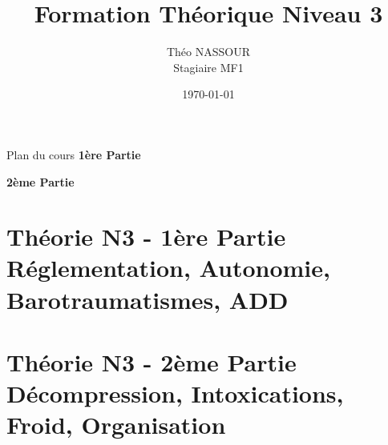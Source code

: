 \documentclass[aspectratio=169]{beamer}
\title[Formation Théorique N3]{Formation Théorique Niveau 3}
\author[Théo NASSOUR]{Théo NASSOUR\\\small Stagiaire MF1}
\institute[CST]{CST — Club Subaquatique Thiernois}
\date[]{\today}
\begin{document}
{
  \begin{frame}
    \titlepage
  \end{frame}
}

{
  \begin{frame}[allowframebreaks]{Plan du cours}
    \textbf{1ère Partie}
    \tableofcontents[part=1]
    
    \vspace{1em}

    \textbf{2ème Partie}
    \tableofcontents[part=2]
  \end{frame}
}


\part{Théorie N3 - 1ère Partie\\Réglementation, Autonomie, Barotraumatismes, ADD}







\part{Théorie N3 - 2ème Partie\\Décompression, Intoxications, Froid, Organisation}








\end{document}
